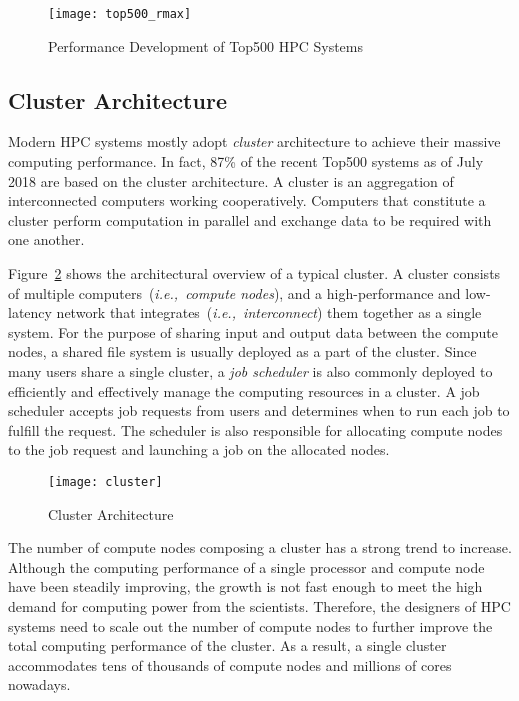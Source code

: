 \begin{figure}
    \centering
    \texttt{[image: top500\_rmax]}
    \caption{Performance Development of Top500 HPC Systems~\autocite{top500}}%
    \label{fig:top500-rmax}
\end{figure}

\subsection{Cluster Architecture}\label{i:cluster-arch}

Modern HPC systems mostly adopt \emph{cluster} architecture to achieve their
massive computing performance. In fact, 87\% of the recent Top500 systems
as of July 2018 are based on the cluster architecture. A cluster is an
aggregation of interconnected computers working cooperatively. Computers that
constitute a cluster perform computation in parallel and exchange data to be
required with one another.

Figure~\ref{fig:cluster} shows the architectural overview of a typical
cluster. A cluster consists of multiple computers~(\emph{i.e.,\ compute
nodes}), and a high-performance and low-latency network that
integrates~(\emph{i.e.,\ interconnect}) them together as a single system. For
the purpose of sharing input and output data between the compute nodes, a
shared file system is usually deployed as a part of the cluster. Since many
users share a single cluster, a \emph{job scheduler} is also commonly deployed
to efficiently and effectively manage the computing resources in a cluster. A
job scheduler accepts job requests from users and determines when to run each
job to fulfill the request. The scheduler is also responsible for allocating
compute nodes to the job request and launching a job on the allocated nodes.

\begin{figure}
    \centering
    \texttt{[image: cluster]}
    \caption{Cluster Architecture}%
    \label{fig:cluster}
\end{figure}

The number of compute nodes composing a cluster has a strong trend to
increase. Although the computing performance of a single processor and compute
node have been steadily improving, the growth is not fast enough to meet the
high demand for computing power from the scientists. Therefore, the designers
of HPC systems need to scale out the number of compute nodes to further
improve the total computing performance of the cluster. As a result, a single
cluster accommodates tens of thousands of compute nodes and millions of cores
nowadays.

